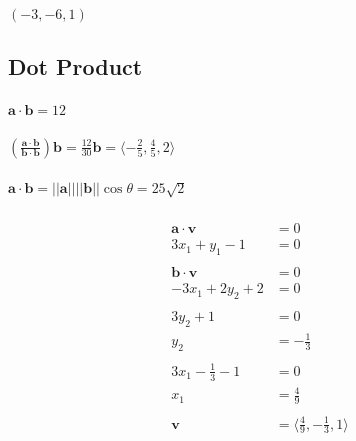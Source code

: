 \documentclass{article}
\begin{document}
$(-3, -6, 1)$

\subsection{Dot Product}

\subsubsection{}

$\mathbf{a} \cdot \mathbf{b} = 12$

\setcounter{subsubsection}{10}
\subsubsection{}

$\left( \frac{\mathbf{a} \cdot \mathbf{b}}{\mathbf{b} \cdot \mathbf{b}} \right) \mathbf{b} = \frac{12}{30} \mathbf{b} = \langle -\frac{2}{5}, \frac{4}{5}, 2 \rangle$

\setcounter{subsubsection}{12}
\subsubsection{}

$\mathbf{a} \cdot \mathbf{b} = ||\mathbf{a}|| ||\mathbf{b}|| \cos \theta = 25 \sqrt{2}$

\setcounter{subsubsection}{16}
\subsubsection{}

\begin{align*}
  \mathbf{a} \cdot \mathbf{v} & = 0                                            \\
  3 x_1 + y_1 - 1             & = 0                                            \\ \\
  \mathbf{b} \cdot \mathbf{v} & = 0                                            \\
  -3 x_1 + 2 y_2 + 2          & = 0                                            \\ \\
  3 y_2 + 1                   & = 0                                            \\
  y_2                         & = -\frac{1}{3}                                 \\ \\
  3 x_1 - \frac{1}{3} - 1     & = 0                                            \\
  x_1                         & = \frac{4}{9}                                  \\ \\
  \mathbf{v}                  & = \langle \frac{4}{9}, -\frac{1}{3}, 1 \rangle
\end{align*}
\end{document}
